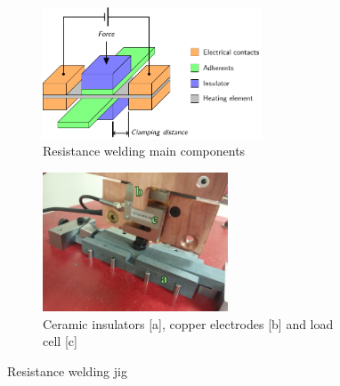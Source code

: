 \documentclass[11pt,review,times]{elsarticle}
\begin{document}
\begin{figure}[htb]
	\centering
	\captionsetup{width=125mm}
	\begin{subfigure}{65mm}
		\centering
		\captionsetup{width=65mm}
		\includegraphics[width=65mm]{Fig1a.pdf}
		\caption{Resistance welding main components \cite{Brassard2018_figshare_article1}}
		\label{fig:welding_jig_schematic}
	\end{subfigure}
	\begin{subfigure}{55mm}
		\centering
		\captionsetup{width=55mm}
		\includegraphics[width=55mm]{Fig1b.jpg}
		\caption{Ceramic insulators [a], copper electrodes [b] and load cell [c]}
		\label{fig:welding_jig_electrodes}
	\end{subfigure}%
	\caption{Resistance welding jig \cite{Brassard2018_figshare_article1}}
	\label{fig:welding_jig}
\end{figure}
\end{document}
